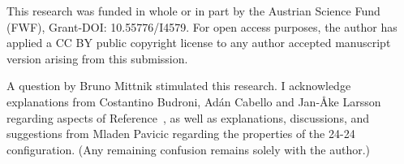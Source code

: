 \documentclass[
  twocolumn,
 showpacs,
 showkeys,
 preprintnumbers,
 amsmath,amssymb,
 aps,
 prl,
  longbibliography,
 floatfix,
 ]{revtex4-2}
\begin{document}
\begin{acknowledgments}

This research was funded in whole or in part by the Austrian Science Fund (FWF), Grant-DOI: 10.55776/I4579. For open access purposes, the author has applied a CC BY public copyright license to any author accepted manuscript version arising from this submission.

A question by Bruno Mittnik stimulated this research.
I acknowledge explanations from Costantino Budroni, Ad\'an Cabello and Jan-\AA{}ke Larsson regarding aspects of Reference~\cite{cabello2021contextuality},
as well as explanations, discussions, and suggestions from Mladen Pavicic regarding the properties of the 24-24 configuration.
(Any remaining confusion remains solely with the author.)
\end{acknowledgments}





\end{document}
